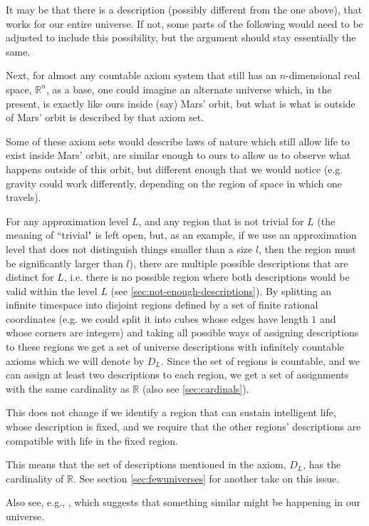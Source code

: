 \documentclass[a4paper
,draft
]{article}
\def\reale{\mathbb{R}}
\def\descriptions{D_L}
\newcommand{\ghilimele}[1]{``#1"}
\begin{document}
It may be that there is a description (possibly different from the one above),
that works for our entire universe.
If not, some parts of the following would need to
be adjusted to include this possibility, but the argument should stay
essentially the same.

Next, for almost any countable axiom system that still
has an $n$-dimensional real space, $\reale^n$, as a base,
one could imagine an alternate universe
which, in the present, is exactly like ours inside (say) Mars' orbit,
but what is what is outside of Mars' orbit is described by that axiom set.

Some of these axiom sets would describe laws of nature which still allow life
to exist inside Mars' orbit, are similar enough
to ours to allow us to observe what happens outside of this orbit,
but different enough that
we would notice (e.g. gravity could work differently, depending on the region
of space in which one travels).

For any approximation level $L$, and any region that is not trivial
for $L$
(the meaning of \ghilimele{trivial} is left open, but, as an example,
if we use an approximation level that does not distinguish things smaller
than a size $l$, then the region must be significantly larger than $l$),
there are multiple possible descriptions that
are distinct for $L$, i.e. there is no possible region where both descriptions
would be valid within the level $L$ (see \ref{sec:not-enough-descriptions}).
By splitting an infinite timespace
into disjoint regions defined by a set of finite rational coordinates
(e.g. we could split it into cubes whose edges have length $1$ and whose
corners are integers)
and taking all possible ways of assigning descriptions to these regions
we get a set of universe descriptions with infinitely countable axioms
which we will denote by $\descriptions$.
Since the set of regions is countable, and we can assign at least two
descriptions to each region, we get a set of assignments with the same
cardinality as $\reale$ (also see \ref{sec:cardinals}).

This does not change if we identify a region that can sustain intelligent life,
whose description is fixed,
and we require that the other regions' descriptions are compatible with life
in the fixed region.

This means that the set of descriptions mentioned in the axiom,
$\descriptions$, has the cardinality of $\reale$. See section
\ref{sec:fewuniverses} for another take on this issue.

Also see, e.g., \parencite{Manson2003}, which suggests that something similar
might be happening in our universe.
\end{document}
